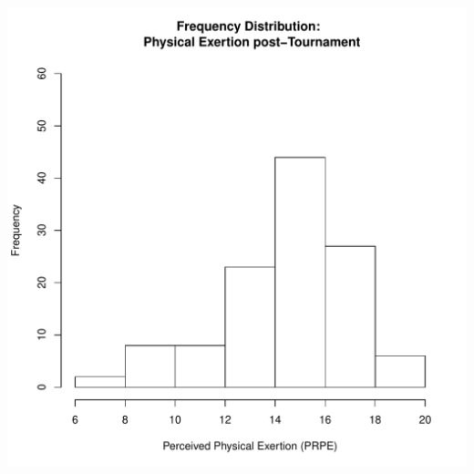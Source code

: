 \documentclass[12pt]{report}
\begin{document}
\includegraphics[scale =.4]{../images/distPrpePost.pdf}
\end{document}
